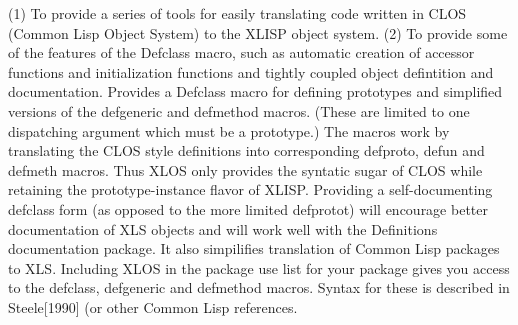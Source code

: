 
\hfuzz=5pt


\beginMotivationDesc
 (1) To provide a series of tools for easily
  translating code written in CLOS (Common Lisp Object System) to the
  XLISP object system.  (2) To provide some of the features of the
  Defclass macro, such as automatic creation of accessor functions and
  initialization functions and tightly coupled object defintition and
  documentation. 
\endMotivationDesc
{}
\projectReviewer{ }{ }
\beginFunctionalDesc
 Provides a Defclass macro for
  defining prototypes and simplified versions of the defgeneric and
  defmethod macros.  (These are limited to one dispatching argument
  which must be a prototype.)  The macros work by translating the CLOS
  style definitions into corresponding defproto, defun and defmeth
  macros.  Thus XLOS only provides the syntatic sugar of CLOS while
  retaining the prototype-instance flavor of XLISP. 
\endFunctionalDesc
\beginStatDesc
 Providing a self-documenting defclass form
  (as opposed to the more limited defprotot) will encourage better
  documentation of XLS objects and will work well with the Definitions
  documentation package.  It also simpilifies translation of Common
  Lisp packages to XLS. 
\endStatDesc
\beginRefs
{}
\endRefs
\beginInstructions
 Including XLOS in the package use list for your
  package gives you access to the defclass, defgeneric and defmethod
  macros.  Syntax for these is described in Steele[1990] (or other
  Common Lisp references. 
\endInstructions
\beginExamples
{}
